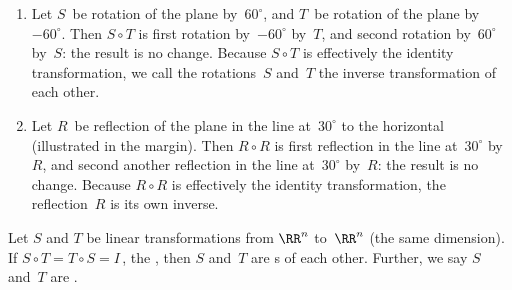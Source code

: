 \begin{example} \label{eg:}
\begin{enumerate}
\item Let \(S\)~be rotation of the plane by~\(60^\circ\), and \(T\)~be rotation of the plane by~\(-60^\circ\).
Then \(S\circ T\) is first rotation by~\(-60^\circ\) by~\(T\), and second rotation by~\(60^\circ\) by~\(S\): the result is no change.
Because \(S\circ T\) is effectively the identity transformation, we call the rotations~\(S\) and~\(T\) the inverse transformation of each other.

\item Let \(R\)~be reflection of the plane in the line at~\(30^\circ\) to the horizontal (illustrated in the margin).  
%
Then \(R\circ R\) is first reflection in the line at~\(30^\circ\) by~\(R\), and second another reflection in the line at~\(30^\circ\) by~\(R\): the result is no change.
Because \(R\circ R\) is effectively the identity transformation, the reflection~\(R\) is its own inverse.
\end{enumerate}
\end{example}



\begin{definition} \label{def:invLT} 
Let \(S\) and \(T\) be linear transformations from \(\RR^n\) to~\(\RR^n\) (the same dimension).
If \(S\circ T=T\circ S=I\)\,, the , then \(S\) and~\(T\) are s of each other.  
Further, we say \(S\) and~\(T\) are .
\end{definition}



